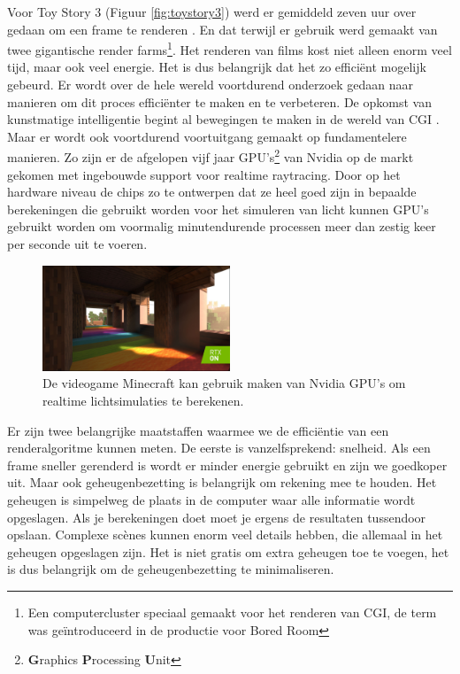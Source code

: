 \documentclass[12pt, a4paper]{article}
\begin{document}
Voor Toy Story 3 (Figuur \ref{fig:toystory3}) werd er gemiddeld zeven uur over gedaan om een frame te renderen \cite{HowToyStory3WasMade}. En dat terwijl er gebruik werd gemaakt van twee gigantische render farms\footnote{Een computercluster speciaal gemaakt voor het renderen van CGI, de term was geïntroduceerd in de productie voor Bored Room\cite{MakingOfBoredRoom}}. Het renderen van films kost niet alleen enorm veel tijd, maar ook veel energie. Het is dus belangrijk dat het zo efficiënt mogelijk gebeurd. Er wordt over de hele wereld voortdurend onderzoek gedaan naar manieren om dit proces efficiënter te maken en te verbeteren. De opkomst van kunstmatige intelligentie begint al bewegingen te maken in de wereld van CGI \cite{NeRFactor}. Maar er wordt ook voortdurend voortuitgang gemaakt op fundamentelere manieren. Zo zijn er de afgelopen vijf jaar GPU's\footnote{\textbf{G}raphics \textbf{P}rocessing \textbf{U}nit} van Nvidia op de markt gekomen met ingebouwde support voor realtime raytracing\cite{NvidiaRTX}. Door op het hardware niveau de chips zo te ontwerpen dat ze heel goed zijn in bepaalde berekeningen die gebruikt worden voor het simuleren van licht kunnen GPU's gebruikt worden om voormalig minutendurende processen meer dan zestig keer per seconde uit te voeren. 
\begin{figure}[H]
    \centering
    \includegraphics[width=0.5\textwidth]{minecraftrtx.jpg}
    \caption{De videogame Minecraft kan gebruik maken van Nvidia GPU's om realtime lichtsimulaties te berekenen.}
    \label{fig:minecraftrtx}
\end{figure}

Er zijn twee belangrijke maatstaffen waarmee we de efficiëntie van een renderalgoritme kunnen meten. De eerste is vanzelfsprekend: snelheid. Als een frame sneller gerenderd is wordt er minder energie gebruikt en zijn we goedkoper uit. Maar ook geheugenbezetting is belangrijk om rekening mee te houden. Het geheugen is simpelweg de plaats in de computer waar alle informatie wordt opgeslagen. Als je berekeningen doet moet je ergens de resultaten tussendoor opslaan. Complexe scènes kunnen enorm veel details hebben, die allemaal in het geheugen opgeslagen zijn. Het is niet gratis om extra geheugen toe te voegen, het is dus belangrijk om de geheugenbezetting te minimaliseren. 
\end{document}
